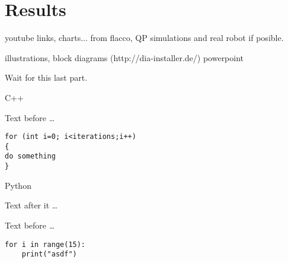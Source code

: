 \chapter{Results}
\label{resultschap}

youtube links, charts... from flacco, QP simulations and real robot if posible.

illustrations, block diagrams (http://dia-installer.de/) powerpoint

Wait for this last part.


C++

Text before \dots
\begin{lstlisting}
for (int i=0; i<iterations;i++)
{
do something
}
\end{lstlisting}

Python

Text after it \dots


Text before \dots
\begin{lstlisting}
for i in range(15):
    print("asdf")
\end{lstlisting}

